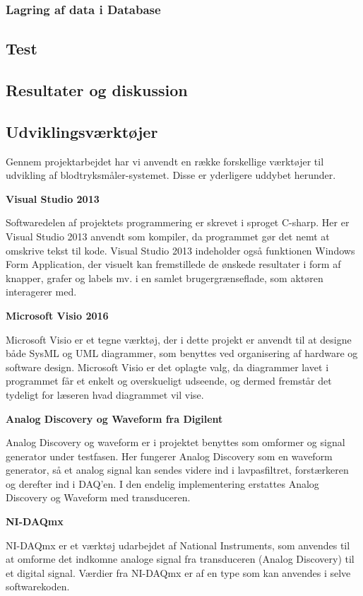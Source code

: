 \subsubsection{Lagring af data i Database}

\subsection{Test}
\subsection{Resultater og diskussion}
\subsection{Udviklingsværktøjer}

Gennem projektarbejdet har vi anvendt en række forskellige værktøjer til udvikling af blodtryksmåler-systemet. Disse er yderligere uddybet herunder.

\textbf{Visual Studio 2013}

Softwaredelen af projektets programmering er skrevet i sproget C-sharp. Her er Visual Studio 2013 anvendt som kompiler, da programmet gør det nemt at omskrive tekst til kode. Visual Studio 2013 indeholder også funktionen Windows Form Application, der visuelt kan fremstillede de ønskede resultater i form af knapper, grafer og labels mv. i en samlet brugergrænseflade, som aktøren interagerer med. 

\textbf{Microsoft Visio 2016}

Microsoft Visio er et tegne værktøj, der i dette projekt er anvendt til at designe både SysML og UML diagrammer, som benyttes ved organisering af hardware og software design. Microsoft Visio er det oplagte valg, da diagrammer lavet i programmet får et enkelt og overskueligt udseende, og dermed fremstår det tydeligt for læseren hvad diagrammet vil vise.

\textbf{Analog Discovery og Waveform fra Digilent}

Analog Discovery og waveform er i projektet benyttes som omformer og signal generator under testfasen. Her fungerer Analog Discovery som en waveform generator, så et analog signal kan sendes videre ind i lavpasfiltret, forstærkeren og derefter ind i DAQ’en. I den endelig implementering erstattes Analog Discovery og Waveform med transduceren. 

\textbf{NI-DAQmx}

NI-DAQmx er et værktøj udarbejdet af National Instruments, som anvendes til at omforme det indkomne analoge signal fra transduceren (Analog Discovery) til et digital signal. Værdier fra NI-DAQmx er af en type som kan anvendes i selve softwarekoden. 

